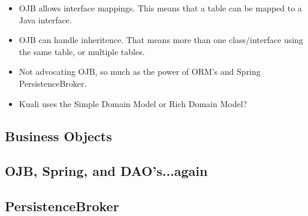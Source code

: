 \begin{ifhtml}
\begin{s5slide}
      \begin{s5notes}
        \begin{itemize}
          \item OJB allows interface mappings. This means that a table can be mapped to a Java interface.
          \item OJB can handle inheritence. That means more than one class/interface using the same table, 
            or multiple tables.
          \item Not advocating OJB, so much as the power of ORM's and Spring PersistenceBroker.
          \item Kuali uses the Simple Domain Model or Rich Domain Model?
        \end{itemize}
      \end{s5notes}
    \end{s5slide}

    \begin{s5slide}
      \section{Business Objects}
      \begin{s5notes}
        \end{s5notes}
    \end{s5slide}

    \begin{s5slide}
      \section{OJB, Spring, and DAO's...again}
      \begin{s5notes}
      \end{s5notes}
    \end{s5slide}

    \begin{s5slide}
      \section{PersistenceBroker}
      \begin{s5notes}
      \end{s5notes}
    \end{s5slide}
\end{ifhtml}